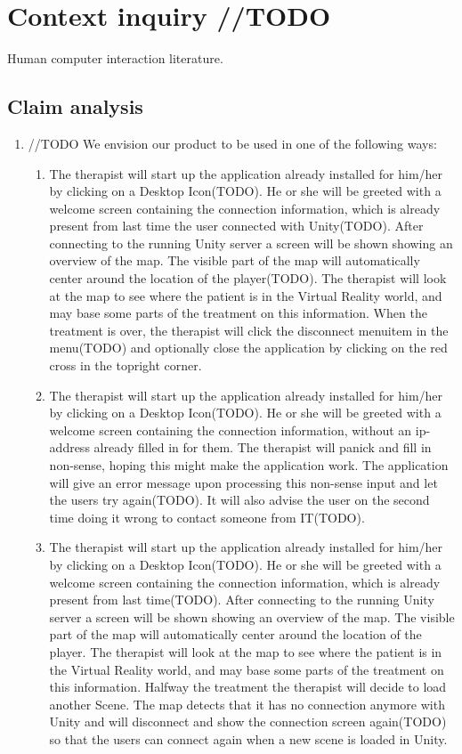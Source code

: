 \documentclass[11pt]{article}
\begin{document}
\section{Context inquiry //TODO}
Human computer interaction literature.
\subsection{Claim analysis}
\begin{enumerate}
    \item //TODO We envision our product to be used in one of the following ways:

		\begin{enumerate}
         \item The therapist will start up the application already installed for him/her by clicking on a Desktop Icon(TODO). He or she will be greeted with a welcome screen containing the connection information, which is already present from last time the user connected with Unity(TODO). After connecting to the running Unity server a screen will be shown showing an overview of the map. The visible part of the map will automatically center around the location of the player(TODO). The therapist will look at the map to see where the patient is in the Virtual Reality world, and may base some parts of the treatment on this information. When the treatment is over, the therapist will click the disconnect menuitem in the menu(TODO) and optionally close the application by clicking on the red cross in the topright corner. 
         \item The therapist will start up the application already installed for him/her by clicking on a Desktop Icon(TODO). He or she will be greeted with a welcome screen containing the connection information, without an ip-address already filled in for them. The therapist will panick and fill in non-sense, hoping this might make the application work. The application will give an error message upon processing this non-sense input and let the users try again(TODO). It will also advise the user on the second time doing it wrong to contact someone from IT(TODO).
         \item The therapist will start up the application already installed for him/her by clicking on a Desktop Icon(TODO). He or she will be greeted with a welcome screen containing the connection information, which is already present from last time(TODO). After connecting to the running Unity server a screen will be shown showing an overview of the map. The visible part of the map will automatically center around the location of the player. The therapist will look at the map to see where the patient is in the Virtual Reality world, and may base some parts of the treatment on this information. Halfway the treatment the therapist will decide to load another Scene. The map detects that it has no connection anymore with Unity and will disconnect and show the connection screen again(TODO) so that the users can connect again when a new scene is loaded in Unity. 

\end{enumerate}
\end{enumerate}
\end{document}
